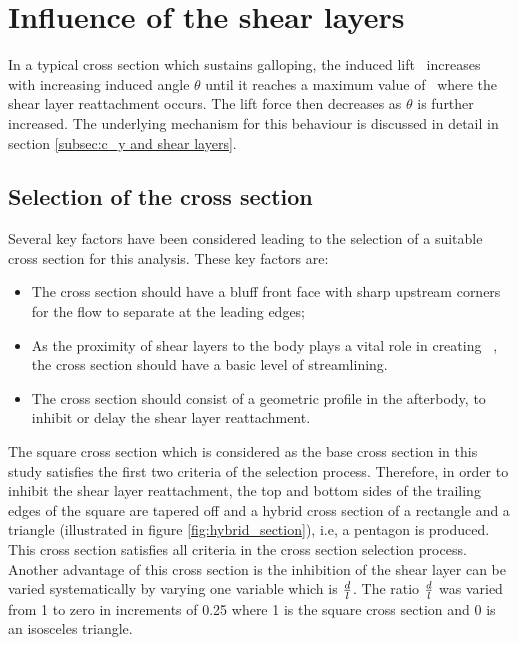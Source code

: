 \section{Influence of the shear layers}

In a typical cross section which sustains galloping, the induced lift \cy\ increases with increasing induced angle $\theta$ until it reaches a maximum value of \cy\ where the shear layer reattachment occurs. The lift force then decreases as $\theta$ is further increased. The underlying mechanism for this behaviour is discussed in detail in section \ref{subsec:c_y and shear layers}.   

\subsection*{Selection of the cross section}



Several key factors have been considered leading to the selection of a suitable cross section for this analysis. These key factors are:

\begin{itemize}
\item The cross section should have a bluff front face with sharp upstream corners for the flow to separate at the leading edges;

\item As the proximity of shear layers to the body plays a vital role in creating \cy\ \citep{Parkinson1989}, the cross section should have a basic level of streamlining.

\item The cross section should consist of a geometric profile in the afterbody, to inhibit or delay the shear layer reattachment.   
\end{itemize}

The square cross section which is considered as the base cross section in this study satisfies the first two criteria of the selection process. Therefore, in order to inhibit the shear layer reattachment, the top and bottom sides of the trailing edges of the square are tapered off and a hybrid cross section of a rectangle and a triangle (illustrated in figure \ref{fig:hybrid_section}), i.e, a pentagon is produced. This cross section satisfies all criteria in the cross section selection process. Another advantage of this cross section is the inhibition of the shear layer can be varied systematically by varying one variable which is $\frac{d}{l}$. The ratio $\frac{d}{l}$ was varied from 1 to zero in increments of 0.25 where 1 is the square cross section and 0 is an isosceles triangle. 


